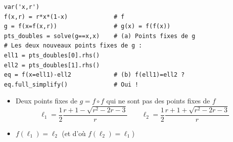 \begin{frame}[fragile]
\begin{algo}
\begin{lstlisting}
var('x,r')
f(x,r) = r*x*(1-x)             # f
g = f(x=f(x,r))                # g(x) = f(f(x))
pts_doubles = solve(g==x,x)    # (a) Points fixes de g
# Les deux nouveaux points fixes de g :
ell1 = pts_doubles[0].rhs()
ell2 = pts_doubles[1].rhs()
eq = f(x=ell1)-ell2            # (b) f(ell1)=ell2 ?
eq.full_simplify()             # Oui !
\end{lstlisting}
\end{algo}

\pause
 \begin{itemize}
    \item Deux points fixes de $g = f\circ f$ qui ne sont pas des points fixes de $f$   
    $$\ell_1 = \frac12\frac{r + 1 - \sqrt{r^2 - 2r - 3}}{r} \qquad 
      \ell_2 = \frac12\frac{r + 1 + \sqrt{r^2 - 2r - 3}}{r}$$
     
  \vspace*{-2ex}   
  
\pause      
    \item $f(\ell_1) = \ell_2$ (et d'où $f(\ell_2)=\ell_1$)
 \end{itemize}
\end{frame}

